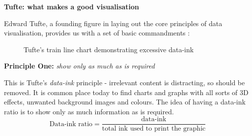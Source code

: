 \documentclass[a4paper,11pt,titlepage]{article}
\begin{document}

\textbf{Tufte: what makes a good visualisation}
		\par 
		Edward Tufte, a founding figure in laying out the core principles of data visualisation, provides us with a set of basic commandments \cite{Tufte2001}:		

		\begin{figure}[H]
    			\centering	
    			\qquad
    			\caption{Tufte's train line chart demonstrating excessive data-ink}%
		\end{figure}

		\par
		\textbf{Principle One:} \textit{show only as much as is required}
		\par 
		This is Tufte's \textit{data-ink} principle - irrelevant content is distracting, so should be removed. It is common place today to find charts and graphs with all sorts of 3D effects, unwanted background images and colours. The idea of having a data-ink ratio is to show only as much information as is required.
		$$
		\text{Data-ink ratio} = 
		\frac{\text{data-ink}}{\text{total ink used to print the graphic}}
		$$
		\\\
\end{document}
